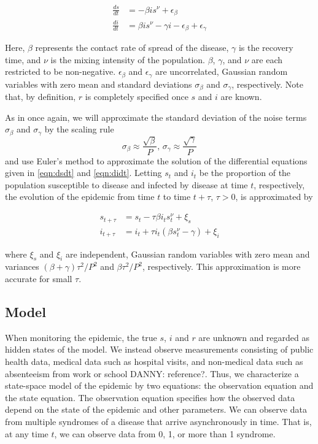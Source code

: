 \documentclass{elsarticle}
\newcommand{\danny}[1]{{\color{blue}DANNY: #1}}
\begin{document}
\begin{align}
\frac{ds}{dt} &= -\beta is^\nu + \epsilon_\beta \label{eqn:dsdt} \\
\frac{di}{dt} &= \beta is^\nu - \gamma i - \epsilon_\beta + \epsilon_\gamma \label{eqn:didt}
\end{align}

\noindent Here, $\beta$ represents the contact rate of spread of the disease, $\gamma$ is the recovery time, and $\nu$ is the mixing intensity of the population.  $\beta$, $\gamma$, and $\nu$ are each restricted to be non-negative.  $\epsilon_\beta$ and $\epsilon_\gamma$ are uncorrelated, Gaussian random variables with zero mean and standard deviations $\sigma_\beta$ and $\sigma_\gamma$, respectively.  Note that, by definition, $r$ is completely specified once $s$ and $i$ are known.

As in \citet{skvortsov2012monitoring} once again, we will approximate the standard deviation of the noise terms $\sigma_\beta$ and $\sigma_\gamma$ by the scaling rule \[\sigma_\beta \approx \frac{\sqrt{\beta}}{P} \mbox{, } \sigma_\gamma \approx \frac{\sqrt{\gamma}}{P}\] and use Euler's method to approximate the solution of the differential equations given in \eqref{eqn:dsdt} and \eqref{eqn:didt}.  Letting $s_t$ and $i_t$ be the proportion of the population susceptible to disease and infected by disease at time $t$, respectively, the evolution of the epidemic from time $t$ to time $t + \tau$, $\tau > 0$, is approximated by

\begin{align}
s_{t+\tau} &= s_t - \tau\beta i_ts^\nu_t + \xi_s \label{eqn:s} \\
i_{t+\tau} &= i_t + \tau i_t(\beta s^\nu_t - \gamma) + \xi_i \label{eqn:i}
\end{align}

\noindent where $\xi_s$ and $\xi_i$ are independent, Gaussian random variables with zero mean and variances $(\beta + \gamma)\tau^2/P^2$ and $\beta\tau^2/P^2$, respectively.  This approximation is more accurate for small $\tau$.

\subsection{Model}

When monitoring the epidemic, the true $s$, $i$ and $r$ are unknown and regarded as hidden states of the model.  We instead observe measurements consisting of public health data, medical data such as hospital visits, and non-medical data such as absenteeism from work or school \danny{reference?}.  Thus, we characterize a state-space model of the epidemic by two equations: the observation equation and the state equation.  The observation equation specifies how the observed data depend on the state of the epidemic and other parameters.  We can observe data from multiple syndromes of a disease that arrive asynchronously in time.  That is, at any time $t$, we can observe data from 0, 1, or more than 1 syndrome.
\end{document}
